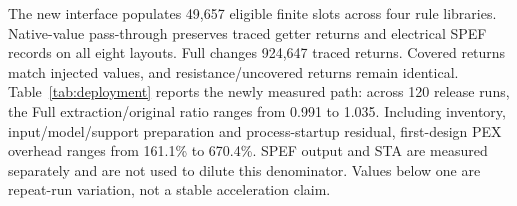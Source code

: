 The new interface populates 49,657 eligible finite slots across four rule libraries. Native-value pass-through preserves traced getter returns and electrical SPEF records on all eight layouts. Full changes 924,647 traced returns. Covered returns match injected values, and resistance/uncovered returns remain identical. Table~\ref{tab:deployment} reports the newly measured path: across 120 release runs, the Full extraction/original ratio ranges from 0.991 to 1.035. Including inventory, input/model/support preparation and process-startup residual, first-design PEX overhead ranges from 161.1\% to 670.4\%. SPEF output and STA are measured separately and are not used to dilute this denominator. Values below one are repeat-run variation, not a stable acceleration claim.
